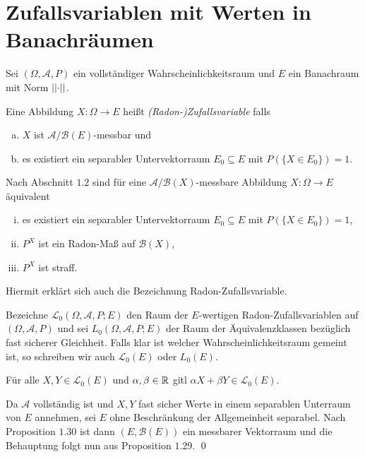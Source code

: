 \section{Zufallsvariablen mit Werten in Banachräumen}
Sei $(\Omega, \mathcal{A}, P)$ ein vollständiger Wahrscheinlichkeitsraum und $E$ ein Banachraum mit Norm $\lvert\lvert \cdot \rvert\rvert$. 
\begin{mydef}
    Eine Abbildung $X: \Omega \to E$ heißt \textit{(Radon-)Zufallsvariable} falls 
    \begin{enumerate}[(a)]
        \item $X$ ist $\mathcal{A}/\mathcal{B}(E)$-messbar und
        \item es existiert ein separabler Untervektorraum $E_0 \subseteq E$ mit $P(\{X \in E_0\}) = 1$. 
    \end{enumerate}
\end{mydef}

\begin{remark}
    Nach Abschnitt $1.2$ sind für eine $\mathcal{A}/\mathcal{B}(X)$-messbare Abbildung $X: \Omega \to E$ äquivalent
    \begin{enumerate}[(i)]
        \item es existiert ein separabler Untervektorraum $E_0 \subseteq E$ mit $P(\{X \in E_0\}) = 1$,
        \item $P^X$ ist ein Radon-Maß auf $\mathcal{B}(X)$, 
        \item $P^X$ ist straff. 
    \end{enumerate}
    Hiermit erklärt sich auch die Bezeichnung Radon-Zufallsvariable. 
\end{remark}

Bezeichne $\mathcal{L}_0(\Omega, \mathcal{A}, P; E)$ den Raum der $E$-wertigen Radon-Zufallsvariablen auf $(\Omega,\mathcal{A},P)$ und sei $L_0(\Omega, \mathcal{A}, P;E)$ der Raum der Äquivalenzklassen bezüglich fast sicherer Gleichheit. 
Falls klar ist welcher Wahrscheinlichkeitsraum gemeint ist, so schreiben wir auch $\mathcal{L}_0(E)$ oder $L_0(E)$. 

\begin{proposition}
   Für alle $X,Y \in \mathcal{L}_0(E)$ und $\alpha, \beta \in \mathbb{R}$ gitl $\alpha X + \beta Y \in \mathcal{L}_0(E)$.
\end{proposition}

\begin{proof*}
    Da $\mathcal{A}$ vollständig ist und $X,Y$ fast sicher Werte in einem separablen Unterraum von $E$ annehmen, sei $E$ ohne Beschränkung der Allgemeinheit separabel. 
    Nach Proposition $1.30$ ist dann $(E, \mathcal{B}(E))$ ein messbarer Vektorraum und die Behauptung folgt nun aus Proposition $1.29$. \qed 
\end{proof*}

